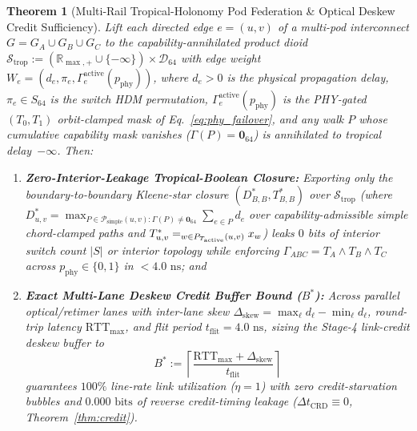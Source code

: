 \documentclass[10pt,twocolumn]{article}
\let\bigsqcap\relax
\newcommand{\bigsqcap}{\mathop{\vphantom{\bigcap}\mathchoice
  {\vcenter{\hbox{\huge$\sqcap$}}}
  {\vcenter{\hbox{\Large$\sqcap$}}}
  {\vcenter{\hbox{\normalsize$\sqcap$}}}
  {\vcenter{\hbox{\small$\sqcap$}}}}\displaylimits}
\theoremstyle{spectralthm}
\newtheorem{theorem}{Theorem}[section]
\begin{document}
\begin{theorem}[Multi-Rail Tropical-Holonomy Pod Federation \& Optical Deskew Credit Sufficiency]
\label{thm:tropical_pod}
Lift each directed edge $e = (u,v)$ of a multi-pod interconnect $G = G_A \cup G_B \cup G_C$ to the capability-annihilated product dioid $\mathcal{S}_{\mathrm{trop}} := (\mathbb{R}_{\max,+} \cup \{-\infty\}) \times \mathcal{D}_{64}$ with edge weight $W_e = (d_e, \pi_e, \Gamma_e^{\mathrm{active}}(p_{\mathrm{phy}}))$, where $d_e > 0$ is the physical propagation delay, $\pi_e \in S_{64}$ is the switch HDM permutation, $\Gamma_e^{\mathrm{active}}(p_{\mathrm{phy}})$ is the PHY-gated $(T_0,T_1)$ orbit-clamped mask of Eq.~\eqref{eq:phy_failover}, and any walk $P$ whose cumulative capability mask vanishes ($\Gamma(P) = \mathbf{0}_{64}$) is annihilated to tropical delay~$-\infty$. Then:
\begin{enumerate}
  \item[(i)] \textbf{Zero-Interior-Leakage Tropical-Boolean Closure:} Exporting only the boundary-to-boundary Kleene-star closure $(D_{B,B}^*, T_{B,B}^*)$ over $\mathcal{S}_{\mathrm{trop}}$ (where $D_{u,v}^* = \max_{P \in \mathcal{P}_{\mathrm{simple}}(u,v) : \Gamma(P) \neq \mathbf{0}_{64}} \sum_{e \in P} d_e$ over capability-admissible simple chord-clamped paths and $T_{u,v}^* = \bigsqcap_{w \in P_{T_{\mathrm{active}}}(u,v)} x_w$) leaks $0$ bits of interior switch count $|S|$ or interior topology while enforcing $\Gamma_{ABC} = T_A \wedge T_B \wedge T_C$ across $p_{\mathrm{phy}} \in \{0,1\}$ in $<4.0\text{~ns}$; and
  \item[(ii)] \textbf{Exact Multi-Lane Deskew Credit Buffer Bound ($B^*$):} Across parallel optical/retimer lanes with inter-lane skew $\Delta_{\mathrm{skew}} = \max_\ell d_\ell - \min_\ell d_\ell$, round-trip latency $\mathrm{RTT}_{\max}$, and flit period $t_{\mathrm{flit}} = 4.0\text{~ns}$, sizing the Stage-4 link-credit deskew buffer to
  \begin{equation}
  \label{eq:tropical_buffer}
  B^* := \left\lceil \frac{\mathrm{RTT}_{\max} + \Delta_{\mathrm{skew}}}{t_{\mathrm{flit}}} \right\rceil
  \end{equation}
  guarantees $100\%$ line-rate link utilization ($\eta = 1$) with zero credit-starvation bubbles and $0.000\text{~bits}$ of reverse credit-timing leakage ($\Delta t_{\mathrm{CRD}} \equiv 0$, Theorem~\ref{thm:credit}).
\end{enumerate}
\end{theorem}
\end{document}

